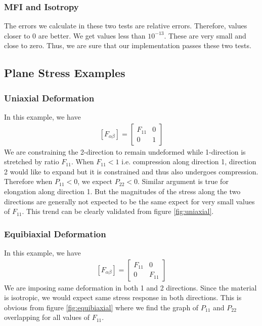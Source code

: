 \documentclass[../main.tex]{subfiles}
\begin{document}
\subsubsection{MFI and Isotropy}
The errors we calculate in these two tests are relative
errors. Therefore, values closer to $0$ are better. We get values less
than $10^{-13}$. These are very small and close to zero. Thus, we are
sure that our implementation passes these two tests.

\subsection{Plane Stress Examples}
\subsubsection{Uniaxial Deformation}
In this example, we have
\begin{align*}
  \left[F_{\alpha\beta}\right] =   \begin{bmatrix}F_{11} & 0\\ 0 & 1 \end{bmatrix}
\end{align*}
We are constraining the 2-direction to remain undeformed while
1-direction is stretched by ratio $F_{11}$. When $F_{11} < 1$
i.e. compression along direction 1, direction 2 would like to expand
but it is constrained and thus also undergoes compression. Therefore
when $P_{11} < 0$, we expect $P_{22} < 0$. Similar argument is true
for elongation along direction 1. But the magnitudes of the stress
along the two directions are generally not expected to be the same
expect for very small values of $F_{11}$. This trend can be clearly
validated from figure \ref{fig:uniaxial}.

\subsubsection{Equibiaxial Deformation}
In this example, we have
\begin{align*}
  \left[F_{\alpha\beta}\right] =   \begin{bmatrix}F_{11} & 0\\ 0 & F_{11} \end{bmatrix}
\end{align*}
We are imposing same deformation in both 1 and 2 directions. Since the
material is isotropic, we would expect same stress response in both
directions. This is obvious from figure \ref{fig:equibiaxial} where we
find the graph of $P_{11}$ and $P_{22}$ overlapping for all values of
$F_{11}$.
\end{document}
